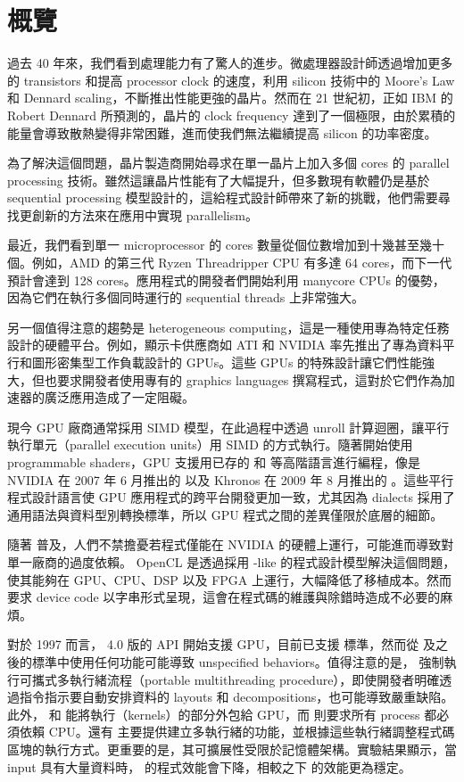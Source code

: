 \chapter{概覽}

過去 40 年來，我們看到處理能力有了驚人的進步。微處理器設計師透過增加更多的 transistors 和提高 processor clock 的速度，利用 silicon 技術中的 Moore's Law 和 Dennard scaling，不斷推出性能更強的晶片。然而在 21 世紀初，正如 IBM 的 Robert Dennard 所預測的，晶片的 clock frequency 達到了一個極限，由於累積的能量會導致散熱變得非常困難，進而使我們無法繼續提高 silicon 的功率密度。

為了解決這個問題，晶片製造商開始尋求在單一晶片上加入多個 cores 的 parallel processing 技術。雖然這讓晶片性能有了大幅提升，但多數現有軟體仍是基於 sequential processing 模型設計的，這給程式設計師帶來了新的挑戰，他們需要尋找更創新的方法來在應用中實現 parallelism。

最近，我們看到單一 microprocessor 的 cores 數量從個位數增加到十幾甚至幾十個。例如，AMD 的第三代 Ryzen Threadripper CPU 有多達 64 cores，而下一代預計會達到 128 cores。應用程式的開發者們開始利用 manycore CPUs 的優勢，因為它們在執行多個同時運行的 sequential threads 上非常強大。

另一個值得注意的趨勢是 heterogeneous computing，這是一種使用專為特定任務設計的硬體平台。例如，顯示卡供應商如 ATI 和 NVIDIA 率先推出了專為資料平行和圖形密集型工作負載設計的 GPUs。這些 GPUs 的特殊設計讓它們性能強大，但也要求開發者使用專有的 graphics languages 撰寫程式，這對於它們作為加速器的廣泛應用造成了一定阻礙。

現今 GPU 廠商通常採用 SIMD 模型，在此過程中透過 unroll 計算迴圈，讓平行執行單元（parallel execution units）用 SIMD 的方式執行。隨著開始使用 programmable shaders，GPU 支援用已存的  和  等高階語言進行編程，像是 NVIDIA 在 2007 年 6 月推出的  以及 Khronos 在 2009 年 8 月推出的 。這些平行程式設計語言使 GPU 應用程式的跨平台開發更加一致，尤其因為  dialects 採用了通用語法與資料型別轉換標準，所以 GPU 程式之間的差異僅限於底層的細節。

隨著  普及，人們不禁擔憂若程式僅能在 NVIDIA 的硬體上運行，可能進而導致對單一廠商的過度依賴。 OpenCL 是透過採用 -like 的程式設計模型解決這個問題，使其能夠在 GPU、CPU、DSP 以及 FPGA 上運行，大幅降低了移植成本。然而  要求 device code 以字串形式呈現，這會在程式碼的維護與除錯時造成不必要的麻煩。

對於  1997 而言， 4.0 版的 API 開始支援 GPU，目前已支援  標準，然而從  及之後的標準中使用任何功能可能導致 unspecified behaviors。值得注意的是， 強制執行可攜式多執行緒流程（portable multithreading procedure），即使開發者明確透過指令指示要自動安排資料的 layouts 和 decompositions，也可能導致嚴重缺陷。此外， 和  能將執行（kernels）的部分外包給 GPU，而  則要求所有 process 都必須依賴 CPU。還有  主要提供建立多執行緒的功能，並根據這些執行緒調整程式碼區塊的執行方式。更重要的是，其可擴展性受限於記憶體架構。實驗結果顯示，當 input 具有大量資料時， 的程式效能會下降，相較之下  的效能更為穩定。

